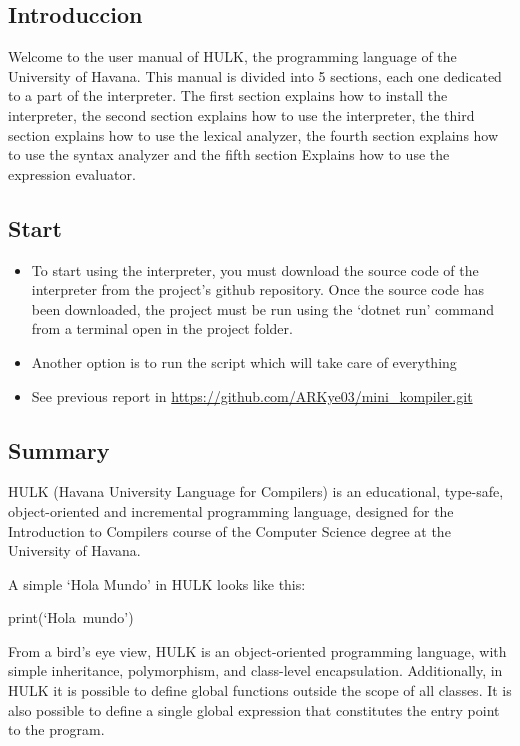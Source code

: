 \newcommand{\copiabletext}[2]{%
    \href{#2}{\texttt{#1}}%
}

\begin{center}
    \centering
    \section{Introduccion}
\end{center}
Welcome to the user manual of HULK, the programming language of the University of Havana. This manual is divided into 5 sections, each one dedicated to a part of the interpreter. The first section explains how to install the interpreter, the second section explains how to use the interpreter, the third section explains how to use the lexical analyzer, the fourth section explains how to use the syntax analyzer and the fifth section Explains how to use the expression evaluator.

\subsection{Start}
    \begin{itemize}
        \item To start using the interpreter, you must download the source code of the interpreter from the project's github repository. Once the source code has been downloaded, the project must be run using the `dotnet run' command from a terminal open in the project folder.
        \item Another option is to run the script which will take care of everything
        \item See previous report in \url{https://github.com/ARKye03/mini_kompiler.git}
    \end{itemize}
    
\subsection{Summary}
HULK (Havana University Language for Compilers) is an educational, type-safe, object-oriented and incremental programming language, designed for the Introduction to Compilers course of the Computer Science degree at the University of Havana.

A simple `Hola Mundo' in HULK looks like this:

    \hbox{print{(`Hola mundo')}}

    From a bird's eye view, HULK is an object-oriented programming language, with simple inheritance, polymorphism, and class-level encapsulation. Additionally, in HULK it is possible to define global functions outside the scope of all classes. It is also possible to define a single global expression that constitutes the entry point to the program.

